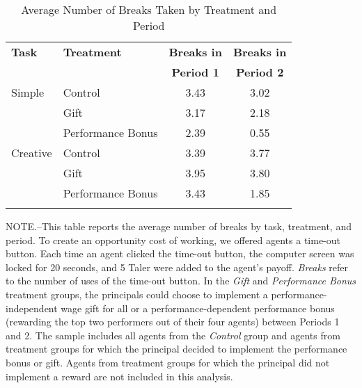 \begin{table}[h]%
\setlength\tabcolsep{2pt}
\caption{Average Number of Breaks Taken by Treatment and Period}
\label{tab:BreaksMeans}
\begin{center}%
{\small\renewcommand{\arraystretch}{1}%
\begin{tabular}{llcc}
\hline\noalign{\smallskip}
\hspace{7pt} \bf Task \hspace{7pt} & \bf Treatment & \bf Breaks in & \bf Breaks in \\
                 &                       & \bf Period 1  & \bf Period 2 \\
\hline
\noalign{\smallskip}
Simple & Control & 3.43 & 3.02 \\
& Gift & 3.17 & 2.18 \\
& Performance Bonus & 2.39 & 0.55 \\
Creative & Control & 3.39 & 3.77 \\
& Gift & 3.95 & 3.80 \\
& Performance Bonus & 3.43 & 1.85 \\
\hline\noalign{\medskip}
\end{tabular}}
\begin{minipage}{\textwidth} \setlength{\parindent}{15pt}
\footnotesize NOTE.--This table reports the average number of breaks by task, treatment, and period. 
To create an opportunity cost of working, we offered agents a time-out button. Each time an agent clicked the time-out button, the computer screen was locked for 20 seconds, and 5 Taler were added to the agent's payoff. \textit{Breaks} refer to the number of uses of the time-out button. 
In the \textit{Gift} and \textit{Performance Bonus} treatment groups, the principals could choose to implement a performance-independent wage gift for all or a performance-dependent performance bonus (rewarding the top two performers out of their four agents) between Periods 1 and 2. 
The sample includes all agents from the \textit{Control} group and agents from treatment groups for which the principal decided to implement the performance bonus or gift. Agents from treatment groups for which the principal did not implement a reward are not included in this analysis. 
\end{minipage}
\end{center}
\end{table}